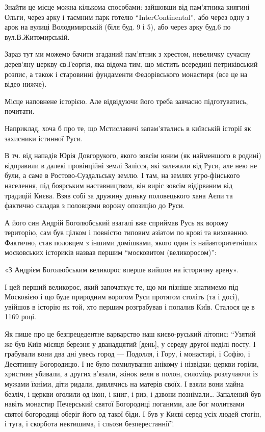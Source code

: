 Знайти це місце можна кількома способами: зайшовши від пам’ятника княгині
Ольги, через арку і таємним парк готелю \enquote{InterContinental}, або через
одну з арок на вулиці Володимирській (біля буд. 9 і 5), або через арку буд.6 по
вул.В.Житомирській. 

Зараз тут ми можемо бачити згаданий пам’ятник з хрестом, невеличку сучасну
дерев’яну церкву св.Георгія, яка відома тим, що містить всередині петриківський
розпис, а також і старовинні фундаменти Федорівського монастиря (все це на
відео нижче). 

Місце наповнене історією. Але відвідуючи його треба завчасно підготуватись,
почитати.

Наприклад, хоча б про те, що Мстиславичі запам'ятались в київській історії як
захисники істинної Руси. 

В тч. від нападів Юрія Довгорукого, якого зовсім юним (як найменшого в родині)
відправили в далекі провінційні землі Залісся, які залежали від Руси, але нею
не були, а саме в Ростово-Суздальську землю. І там, на землях угро-фінського
населення, під боярським наставництвом, він виріс зовсім відірваним від
традицій Києва. Взяв собі за дружину доньку половецького хана Аєпи та фактично
складав з половцями ворожу опозицію до Руси. 

А його син Андрій Боголюбський взагалі вже сприймав Русь як ворожу територію,
сам був цілком і повністю типовим азіатом по крові та вихованню. Фактично, став
половцем з іншими домішками, якого один із найавторитетніших московських
істориків назвав першим \enquote{московитом (великоросом)}: 

«З Андрієм Боголюбським великорос вперше вийшов на історичну арену». 

І цей перший великорос, який започаткує те, що ми пізніше знатимемо під
Московією і що буде природним ворогом Руси протягом століть (та і досі),
увійшов в історію як той, хто першим розграбував і попалив Київ. Сталося це в
1169 році.

Як пише про це безпрецедентне варварство наш києво-руський літопис: \enquote{Узятий же
був Київ місяця березня у дванадцятий [день], у середу другої неділі посту. І
грабували вони два дні увесь город — Подолля, і Гору, і монастирі, і Софію, і
Десятинну Богородицю. І не було помилування анікому і нізвідки: церкви горіли,
християн убивали, а других в’язали, жінок вели в полон, силоміць розлучаючи із
мужами їхніми, діти ридали, дивлячись на матерів своїх. І взяли вони майна
безліч, і церкви оголили од ікон, і книг, і риз, і дзвони познімали… Запалений
був навіть монастир Печерський святої Богородиці поганими, але бог молитвами
святої богородиці оберіг його од такої біди. І був у Києві серед усіх людей
стогін, і туга, і скорбота невтишима, і сльози безперестаннії}. 

